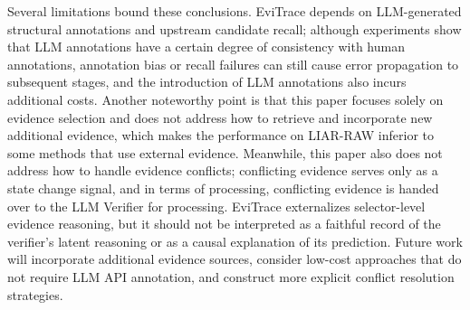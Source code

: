 \documentclass[letterpaper]{article}
\begin{document}
Several limitations bound these conclusions. EviTrace depends on
LLM-generated structural annotations and upstream candidate recall; although experiments show that LLM annotations have a certain degree of consistency with human annotations, annotation bias or recall failures can still cause error propagation to subsequent stages, and the introduction of LLM annotations also incurs additional costs. Another noteworthy point is that this paper focuses solely on evidence selection and does not address how to retrieve and incorporate new additional evidence, which makes the performance on LIAR-RAW inferior to some methods that use external evidence. Meanwhile, this paper also does not address how to handle evidence conflicts; conflicting evidence serves only as a state change signal, and in terms of processing, conflicting evidence is handed over to the LLM Verifier for processing. EviTrace externalizes selector-level evidence reasoning, but it should not be interpreted as a faithful record of the verifier’s latent reasoning or as a causal explanation of its prediction. Future work will incorporate additional evidence sources, consider low-cost approaches that do not require LLM API annotation, and construct more explicit conflict resolution strategies.


\end{document}
